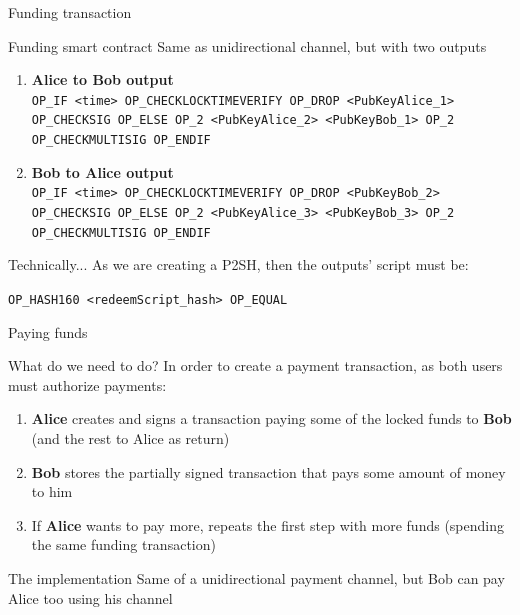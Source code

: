 \documentclass{beamer}
\begin{document}
\begin{frame}{Funding transaction}
 \begin{exampleblock}{Funding smart contract}
  Same as unidirectional channel, but with two outputs
  \begin{center}
   \begin{enumerate}
    \item \textbf{Alice to Bob output}\\
          \small{\texttt{OP\_IF <time> OP\_CHECKLOCKTIMEVERIFY OP\_DROP <PubKeyAlice\_1> OP\_CHECKSIG OP\_ELSE OP\_2 <PubKeyAlice\_2> <PubKeyBob\_1> OP\_2 OP\_CHECKMULTISIG OP\_ENDIF}}
    \item \textbf{Bob to Alice output}\\
          \small{\texttt{OP\_IF <time> OP\_CHECKLOCKTIMEVERIFY OP\_DROP <PubKeyBob\_2> OP\_CHECKSIG OP\_ELSE OP\_2 <PubKeyAlice\_3> <PubKeyBob\_3> OP\_2 OP\_CHECKMULTISIG OP\_ENDIF}}
   \end{enumerate}
  \end{center}
 \end{exampleblock}
 \begin{exampleblock}{Technically...}
  As we are creating a P2SH, then the outputs' script must be:\
  \begin{center}
   \texttt{OP\_HASH160 <redeemScript\_hash> OP\_EQUAL}
  \end{center}
 \end{exampleblock}
\end{frame}
\begin{frame}{Paying funds}
 \begin{block}{What do we need to do?}
  In order to create a payment transaction, as both users must authorize payments:
  \begin{enumerate}
   \item \textbf{Alice} creates and signs a transaction paying some of the locked funds to \textbf{Bob} (and the rest to Alice as return)
   \item \textbf{Bob} stores the partially signed transaction that pays some amount of money to him
   \item If \textbf{Alice} wants to pay more, repeats the first step with more funds (spending the same funding transaction)
  \end{enumerate}
 \end{block}
 \begin{block}{The implementation}
  Same of a unidirectional payment channel, but Bob can pay Alice too using his channel
 \end{block}
\end{frame}
\end{document}
